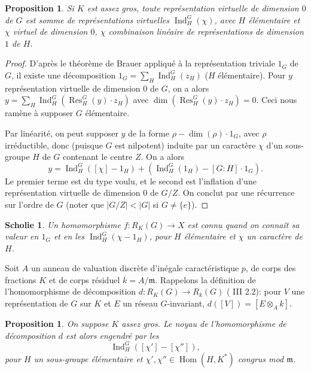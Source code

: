\documentclass[11pt,a4paper]{amsart}
\theoremstyle{plain}
\newtheorem{proposition}[theorem]{Proposition}
\newtheorem{scholie}[theorem]{Scholie}
\theoremstyle{definition}
\DeclareMathOperator{\Ind}{Ind}
\DeclareMathOperator{\Res}{Res}
\DeclareMathOperator{\Hom}{Hom}
\def\dim{\mathop{\mathrm{dim}}\nolimits}
\newenvironment{para}{\par\noindent}{\par}
\begin{document}
\begin{proposition}\label{prop1.5}
Si $K$ est assez gros, toute repr\'esentation virtuelle de dimension $0$ de $G$ est somme de repr\'esentations virtuelles $\Ind_{H}^{G}(\chi)$, avec $H$ \'el\'ementaire et $\chi$ virtuel de dimension $0$, $\chi$ combinaison lin\'eaire de repr\'esentations de dimension $1$ de $H$.
\end{proposition}

\begin{proof}
D'apr\`es le th\'eor\`eme de Brauer appliqu\'e \`a la repr\'esentation triviale $1_{G}$ de $G$, il existe une d\'ecomposition $1_{G} = \sum_{H} \Ind_{H}^{G}(z_{H})$ ($H$ \'el\'ementaire). Pour $y$ repr\'esentation virtuelle de dimension $0$ de $G$, on a alors $y = \sum_{H} \Ind_{H}^{G}(\Res_{H}^{G}(y) \cdot z_{H})$ avec $\dim(\Res_{H}^{G}(y) \cdot z_{H}) = 0$. Ceci nous ram\`ene \`a supposer $G$ \'el\'ementaire.

Par lin\'earit\'e, on peut supposer $y$ de la forme $\rho - \dim(\rho) \cdot 1_{G}$, avec $\rho$ irr\'eductible, donc (puisque $G$ est nilpotent) induite par un caract\`ere $\chi$ d'un sous-groupe $H$ de $G$ contenant le centre $Z$. On a alors
\[
y = \Ind_{H}^{G}([\chi] - 1_{H}) + (\Ind_{H}^{G}(1_{H}) - [G:H] \cdot 1_{G}).
\]
Le premier terme est du type voulu, et le second est l'inflation d'une repr\'esentation virtuelle de dimension $0$ de $G/Z$. On conclut par une r\'ecurrence sur l'ordre de $G$ (noter que $|G/Z| < |G|$ si $G \not= \{e\}$).
\end{proof}

\begin{scholie}\label{scholie1.6}
Un homomorphisme $f: R_{K}(G) \to X$ est connu quand on conna\^it sa valeur en $1_{G}$ et en les $\Ind_{H}^{G}(\chi - 1_{H})$, pour $H$ \'el\'ementaire et $\chi$ un caract\`ere de $H$.
\end{scholie}

\begin{para}
Soit $A$ un anneau de valuation discr\`ete d'in\'egale caract\'eristique $p$, de corps des fractions $K$ et de corps r\'esiduel $k = A/\mathfrak{m}$. Rappelons la d\'efinition de l'homomorphisme de d\'ecomposition $d: R_{K}(G) \to R_{k}(G)$ (\cite{11} III 2.2): pour $V$ une repr\'esentation de $G$ sur $K$ et $E$ un r\'eseau $G$-invariant, $d([V]) = [E \otimes_{A} k]$.
\end{para}

\begin{proposition}\label{prop1.8}
On suppose $K$ assez gros. Le noyau de l'homomorphisme de d\'ecomposition $d$ est alors engendr\'e par les
\[
\Ind_{H}^{G}([\chi'] - [\chi'']),
\]
pour $H$ un sous-groupe \'el\'ementaire et $\chi', \chi'' \in \Hom(H,K^{*})$ congrus mod $\mathfrak{m}$.
\end{proposition}
\end{document}
